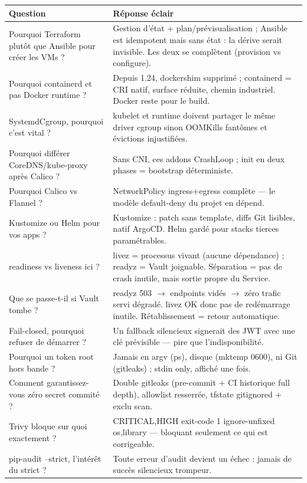 \documentclass[12pt,a4paper]{article}
\begin{document}
\begin{longtable}{@{}p{6.2cm}p{8.0cm}@{}}
\toprule
\textbf{Question} & \textbf{Réponse éclair} \\
\midrule
\endhead
Pourquoi Terraform plutôt que Ansible pour créer les VMs ? & Gestion d'état + plan/prévisualisation ; Ansible est idempotent mais sans état : la dérive serait invisible. Les deux se complètent (provision vs configure). \\
Pourquoi containerd et pas Docker runtime ? & Depuis 1.24, dockershim supprimé ; containerd = CRI natif, surface réduite, chemin industriel. Docker reste pour le build. \\
SystemdCgroup, pourquoi c'est vital ? & kubelet et runtime doivent partager le même driver cgroup sinon OOMKills fantômes et évictions injustifiées. \\
Pourquoi différer CoreDNS/kube-proxy après Calico ? & Sans CNI, ces addons CrashLoop ; init en deux phases = bootstrap déterministe. \\
Pourquoi Calico vs Flannel ? & NetworkPolicy ingress+egress complète --- le modèle default-deny du projet en dépend. \\
Kustomize ou Helm pour vos apps ? & Kustomize : patch sans template, diffs Git lisibles, natif ArgoCD. Helm gardé pour stacks tierces paramétrables. \\
readiness vs liveness ici ? & livez = processus vivant (aucune dépendance) ; readyz = Vault joignable. Séparation = pas de crash inutile, mais sortie propre du Service. \\
Que se passe-t-il si Vault tombe ? & readyz 503 $\rightarrow$ endpoints vidés $\rightarrow$ zéro trafic servi dégradé. livez OK donc pas de redémarrage inutile. Rétablissement = retour automatique. \\
Fail-closed, pourquoi refuser de démarrer ? & Un fallback silencieux signerait des JWT avec une clé prévisible --- pire que l'indisponibilité. \\
Pourquoi un token root hors bande ? & Jamais en argv (ps), disque (mktemp 0600), ni Git (gitleaks) ; stdin only, affiché une fois. \\
Comment garantissez-vous zéro secret commité ? & Double gitleaks (pre-commit + CI historique full depth), allowlist resserrée, tfstate gitignored + exclu scan. \\
Trivy bloque sur quoi exactement ? & CRITICAL,HIGH exit-code 1 ignore-unfixed os,library --- bloquant seulement ce qui est corrigeable. \\
pip-audit --strict, l'intérêt du strict ? & Toute erreur d'audit devient un échec : jamais de succès silencieux trompeur. \\

\end{longtable}
\end{document}
